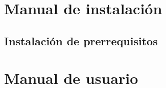 
\chapter{Manual de instalación}

\section{Instalación de prerrequisitos}



\chapter{Manual de usuario}

